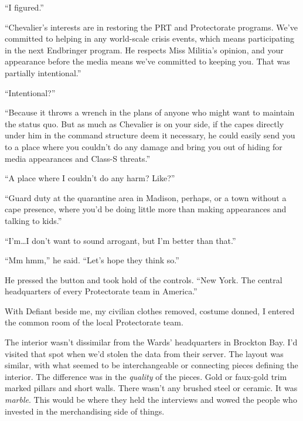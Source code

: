 ``I figured.''



``Chevalier's interests are in restoring the PRT and Protectorate programs.  We've committed to helping in any world-scale crisis events, which means participating in the next Endbringer program.  He respects Miss Militia's opinion, and your appearance before the media means we've committed to keeping you.  That was partially intentional.''



``Intentional?''



``Because it throws a wrench in the plans of anyone who might want to maintain the status quo.  But as much as Chevalier is on your side, if the capes directly under him in the command structure deem it necessary, he could easily send you to a place where you couldn't do any damage and bring you out of hiding for media appearances and Class-S threats.''



``A place where I couldn't do any harm?  Like?''



``Guard duty at the quarantine area in Madison, perhaps, or a town without a cape presence, where you'd be doing little more than making appearances and talking to kids.''



``I'm\ldots I don't want to sound arrogant, but I'm better than that.''



``Mm hmm,'' he said.  ``Let's hope they think so.''



He pressed the button and took hold of the controls.  ``New York.  The central headquarters of every Protectorate team in America.''



\blacksquare



With Defiant beside me, my civilian clothes removed, costume donned, I entered the common room of the local Protectorate team.



The interior wasn't dissimilar from the Wards' headquarters in Brockton Bay.  I'd visited that spot when we'd stolen the data from their server.  The layout was similar, with what seemed to be interchangeable or connecting pieces defining the interior.  The difference was in the \emph{quality} of the pieces.  Gold or faux-gold trim marked pillars and short walls.  There wasn't any brushed steel or ceramic.  It was \emph{marble}.  This would be where they held the interviews and wowed the people who invested in the merchandising side of things.



